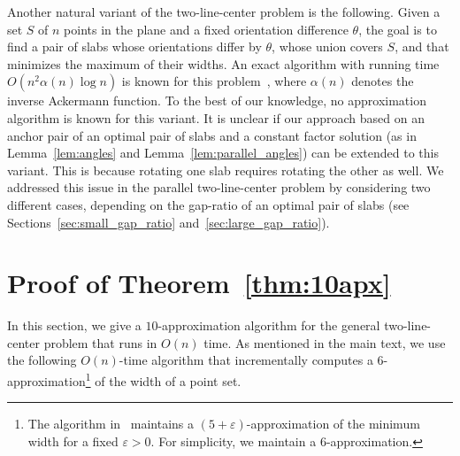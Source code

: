 \documentclass[english,a4paper, cleveref, autoref, thm-restate, nolineno]{socg-lipics-v2021}
\theoremstyle{star}
\theoremstyle{claimstar}
\newcommand{\eps}{\ensuremath{\varepsilon}}
\begin{document}
Another natural variant of the two-line-center problem is the following. Given a set $S$ of $n$ points in the plane and a fixed orientation difference $\theta$, the goal is to find a pair of slabs whose orientations differ by $\theta$, whose union covers $S$, and that minimizes the maximum of their widths. 
An exact algorithm with running time $O(n^2 \alpha(n)\log n)$ is known for this problem~\cite{ahn2024constrained}, where $\alpha(n)$ denotes the inverse Ackermann function. 
To the best of our knowledge, no approximation algorithm is known for this variant.
It is unclear if our approach based on an anchor pair of an optimal pair of slabs and a constant factor solution (as in Lemma~\ref{lem:angles} and Lemma~\ref{lem:parallel_angles}) can be extended to this variant.
This is because rotating one slab requires rotating the other as well. We addressed this issue in the parallel two-line-center problem by considering two different cases, depending on the gap-ratio of an optimal pair of slabs (see Sections~\ref{sec:small_gap_ratio} and~\ref{sec:large_gap_ratio}).

















\appendix



\section{Proof of Theorem~\ref{thm:10apx}}
\label{sec:linear_10apx}

In this section, we give a $10$-approximation algorithm for the general two-line-center problem that runs in $O(n)$ time. 
As mentioned in the main text, we use the following $O(n)$-time algorithm that incrementally computes a $6$-approximation\footnote{The algorithm in~\cite{chan2006faster} maintains a $(5+\eps)$-approximation of the minimum width for a fixed $\eps>0$. For simplicity, we maintain a $6$-approximation.} of the width of a point set.
\end{document}
